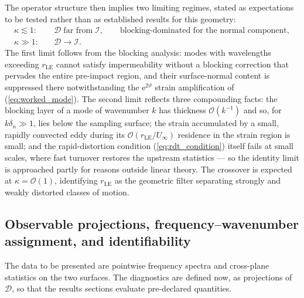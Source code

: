 \documentclass[lineno]{JFM-FLM_Au}
\begin{document}
The operator structure then implies two limiting regimes, stated as
expectations to be tested rather than as established results for this
geometry:
\begin{equation}
\begin{aligned}
\kappa \lesssim 1:\quad
&\mathcal{D} \;\text{far from}\; \mathcal{I},
\qquad
\text{blocking-dominated for the normal component},
\\
\kappa \gg 1:\quad
&\mathcal{D} \to \mathcal{I}.
\end{aligned}
\label{eq:limits}
\end{equation}
The first limit follows from the blocking analysis: modes with wavelengths
exceeding $r_{\mathrm{LE}}$ cannot satisfy impermeability without a
blocking correction that pervades the entire pre-impact region, and their
surface-normal content is suppressed there notwithstanding the
$\mathrm{e}^{2\vartheta}$ strain amplification of
(\ref{eq:worked_mode}). The second limit reflects three compounding
facts: the blocking layer of a mode of wavenumber $k$ has thickness
$\mathcal{O}(k^{-1})$ and so, for $k\delta_n \gg 1$, lies below the
sampling surface; the strain accumulated by a small, rapidly convected
eddy during its $\mathcal{O}(r_{\mathrm{LE}}/U_\infty)$ residence in the
strain region is small; and the rapid-distortion condition
(\ref{eq:rdt_condition}) itself fails at small scales, where fast
turnover restores the upstream statistics --- so the identity limit is
approached partly for reasons outside linear theory. The crossover is
expected at $\kappa = \mathcal{O}(1)$, identifying $r_{\mathrm{LE}}$ as
the geometric filter separating strongly and weakly distorted classes of
motion.

\subsection{Observable projections, frequency--wavenumber assignment, and
identifiability}
\label{sec:framework_observables}

The data to be presented are pointwise frequency spectra and cross-plane
statistics on the two surfaces. The diagnostics are defined now, as
projections of $\mathcal{D}$, so that the results sections evaluate
pre-declared quantities.
\end{document}
